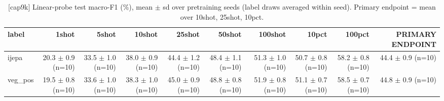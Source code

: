 \begin{table}[t]
\centering
\small
\caption{[cap9k] Linear-probe test macro-F1 (\%), mean $\pm$ sd over pretraining seeds (label draws averaged within seed). Primary endpoint = mean over 10shot, 25shot, 10pct.}
\label{tab:main_results_probe}
\begin{tabular}{lrrrrrrrrr}
\toprule
label & 1shot & 5shot & 10shot & 25shot & 50shot & 100shot & 10pct & 100pct & PRIMARY ENDPOINT \\
\midrule
ijepa & 20.3 $\pm$ 0.9 (n=10) & 33.5 $\pm$ 1.0 (n=10) & 38.0 $\pm$ 0.9 (n=10) & 44.4 $\pm$ 1.2 (n=10) & 48.4 $\pm$ 1.1 (n=10) & 51.3 $\pm$ 1.0 (n=10) & 50.7 $\pm$ 0.8 (n=10) & 58.2 $\pm$ 0.8 (n=10) & 44.4 $\pm$ 0.9 (n=10) \\
veg\_pos & 19.5 $\pm$ 0.8 (n=10) & 33.6 $\pm$ 1.0 (n=10) & 38.3 $\pm$ 1.0 (n=10) & 45.0 $\pm$ 0.9 (n=10) & 48.8 $\pm$ 0.8 (n=10) & 51.9 $\pm$ 0.8 (n=10) & 51.1 $\pm$ 0.7 (n=10) & 58.5 $\pm$ 0.7 (n=10) & 44.8 $\pm$ 0.9 (n=10) \\
\bottomrule
\end{tabular}
\end{table}

